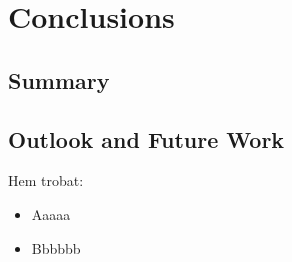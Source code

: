 \documentclass[../main.tex]{subfiles}
\begin{document}
 

\chapter{Conclusions} \label{ch:conclu}

    
    \section{Summary}
    
  
    
    \section{Outlook and Future Work}
    
    Hem trobat:
    \begin{itemize}
        \item Aaaaa
        
        \item Bbbbbb
    \end{itemize}
    
    
\end{document}
